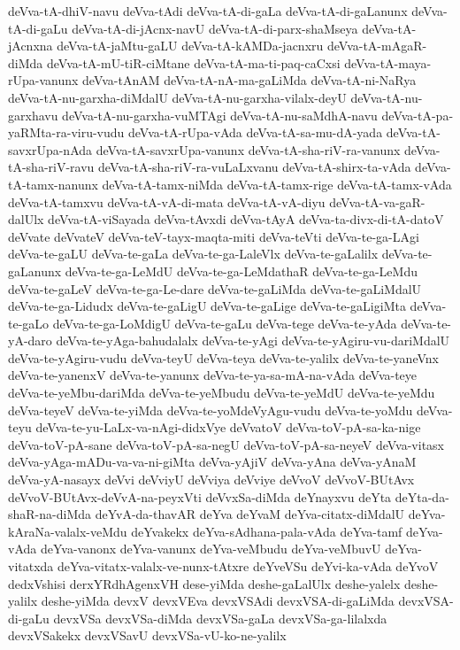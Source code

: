 {deVva-tA-dhiV-navu
deVva-tAdi
deVva-tA-di-gaLa
deVva-tA-di-gaLanunx
deVva-tA-di-gaLu
deVva-tA-di-jAcnx-navU
deVva-tA-di-parx-shaMseya
deVva-tA-jAcnxna
deVva-tA-jaMtu-gaLU
deVva-tA-kAMDa-jacnxru
deVva-tA-mAgaR-diMda
deVva-tA-mU-tiR-ciMtane
deVva-tA-ma-ti-paq-caCxsi
deVva-tA-maya-rUpa-vanunx
deVva-tAnAM
deVva-tA-nA-ma-gaLiMda
deVva-tA-ni-NaRya
deVva-tA-nu-garxha-diMdalU
deVva-tA-nu-garxha-vilalx-deyU
deVva-tA-nu-garxhavu
deVva-tA-nu-garxha-vuMTAgi
deVva-tA-nu-saMdhA-navu
deVva-tA-pa-yaRMta-ra-viru-vudu
deVva-tA-rUpa-vAda
deVva-tA-sa-mu-dA-yada
deVva-tA-savxrUpa-nAda
deVva-tA-savxrUpa-vanunx
deVva-tA-sha-riV-ra-vanunx
deVva-tA-sha-riV-ravu
deVva-tA-sha-riV-ra-vuLaLxvanu
deVva-tA-shirx-ta-vAda
deVva-tA-tamx-nanunx
deVva-tA-tamx-niMda
deVva-tA-tamx-rige
deVva-tA-tamx-vAda
deVva-tA-tamxvu
deVva-tA-vA-di-mata
deVva-tA-vA-diyu
deVva-tA-va-gaR-dalUlx
deVva-tA-viSayada
deVva-tAvxdi
deVva-tAyA
deVva-ta-divx-di-tA-datoV
deVvate
deVvateV
deVva-teV-tayx-maqta-miti
deVva-teVti
deVva-te-ga-LAgi
deVva-te-gaLU
deVva-te-gaLa
deVva-te-ga-LaleVlx
deVva-te-gaLalilx
deVva-te-gaLanunx
deVva-te-ga-LeMdU
deVva-te-ga-LeMdathaR
deVva-te-ga-LeMdu
deVva-te-gaLeV
deVva-te-ga-Le-dare
deVva-te-gaLiMda
deVva-te-gaLiMdalU
deVva-te-ga-Lidudx
deVva-te-gaLigU
deVva-te-gaLige
deVva-te-gaLigiMta
deVva-te-gaLo
deVva-te-ga-LoMdigU
deVva-te-gaLu
deVva-tege
deVva-te-yAda
deVva-te-yA-daro
deVva-te-yAga-bahudalalx
deVva-te-yAgi
deVva-te-yAgiru-vu-dariMdalU
deVva-te-yAgiru-vudu
deVva-teyU
deVva-teya
deVva-te-yalilx
deVva-te-yaneVnx
deVva-te-yanenxV
deVva-te-yanunx
deVva-te-ya-sa-mA-na-vAda
deVva-teye
deVva-te-yeMbu-dariMda
deVva-te-yeMbudu
deVva-te-yeMdU
deVva-te-yeMdu
deVva-teyeV
deVva-te-yiMda
deVva-te-yoMdeVyAgu-vudu
deVva-te-yoMdu
deVva-teyu
deVva-te-yu-LaLx-va-nAgi-didxVye
deVvatoV
deVva-toV-pA-sa-ka-nige
deVva-toV-pA-sane
deVva-toV-pA-sa-negU
deVva-toV-pA-sa-neyeV
deVva-vitasx
deVva-yAga-mADu-va-va-ni-giMta
deVva-yAjiV
deVva-yAna
deVva-yAnaM
deVva-yA-nasayx
deVvi
deVviyU
deVviya
deVviye
deVvoV
deVvoV-BUtAvx
deVvoV-BUtAvx-deVvA-na-peyxVti
deVvxSa-diMda
deYnayxvu
deYta
deYta-da-shaR-na-diMda
deYvA-da-thavAR
deYva
deYvaM
deYva-citatx-diMdalU
deYva-kAraNa-valalx-veMdu
deYvakekx
deYva-sAdhana-pala-vAda
deYva-tamf
deYva-vAda
deYva-vanonx
deYva-vanunx
deYva-veMbudu
deYva-veMbuvU
deYva-vitatxda
deYva-vitatx-valalx-ve-nunx-tAtxre
deYveVSu
deYvi-ka-vAda
deYvoV
dedxVshisi
derxYRdhAgenxVH
dese-yiMda
deshe-gaLalUlx
deshe-yalelx
deshe-yalilx
deshe-yiMda
devxV
devxVEva
devxVSAdi
devxVSA-di-gaLiMda
devxVSA-di-gaLu
devxVSa
devxVSa-diMda
devxVSa-gaLa
devxVSa-ga-lilalxda
devxVSakekx
devxVSavU
devxVSa-vU-ko-ne-yalilx
}
